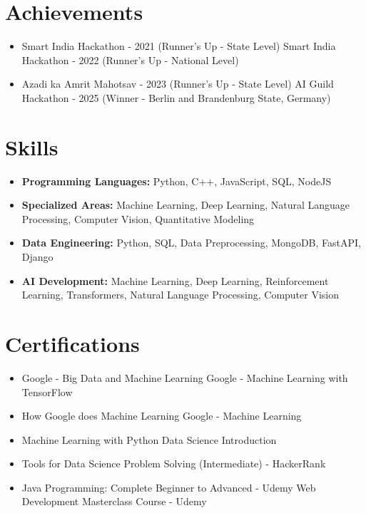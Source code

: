 \documentclass[a4paper,10pt]{article}
\begin{document}
\section*{Achievements}
\begin{itemize}
\item Smart India Hackathon - 2021 (Runner's Up - State Level) \hfill Smart India Hackathon - 2022 (Runner's Up - National Level)
\item Azadi ka Amrit Mahotsav - 2023 (Runner's Up - State Level) \hfill AI Guild Hackathon - 2025 (Winner - Berlin and Brandenburg State, Germany)
\end{itemize}

\section*{Skills}
\begin{itemize}
  \item \textbf{Programming Languages:} Python, C++, JavaScript, SQL, NodeJS
  \item \textbf{Specialized Areas:} Machine Learning, Deep Learning, Natural Language Processing, Computer Vision, Quantitative Modeling
  \item \textbf{Data Engineering:} Python, SQL, Data Preprocessing, MongoDB, FastAPI, Django
  \item \textbf{AI Development:} Machine Learning, Deep Learning, Reinforcement Learning, Transformers, Natural Language Processing, Computer Vision
\end{itemize}

\section*{Certifications}
\begin{itemize}
\item Google - Big Data and Machine Learning \hfill Google - Machine Learning with TensorFlow
\item How Google does Machine Learning \hfill Google - Machine Learning
\item Machine Learning with Python \hfill Data Science Introduction
\item Tools for Data Science \hfill Problem Solving (Intermediate) - HackerRank
\item Java Programming: Complete Beginner to Advanced - Udemy \hfill Web Development Masterclass Course - Udemy
\end{itemize}
\end{document}
